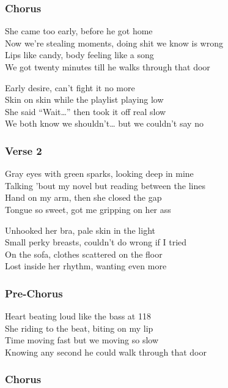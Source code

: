 \subsubsection{Chorus}\label{chorus-85}

She came too early, before he got home\\
Now we're stealing moments, doing shit we know is wrong\\
Lips like candy, body feeling like a song\\
We got twenty minutes till he walks through that door

Early desire, can't fight it no more\\
Skin on skin while the playlist playing low\\
She said ``Wait\ldots'' then took it off real slow\\
We both know we shouldn't\ldots{} but we couldn't say no

\subsubsection{Verse 2}\label{verse-2-33}

Gray eyes with green sparks, looking deep in mine\\
Talking 'bout my novel but reading between the lines\\
Hand on my arm, then she closed the gap\\
Tongue so sweet, got me gripping on her ass

Unhooked her bra, pale skin in the light\\
Small perky breasts, couldn't do wrong if I tried\\
On the sofa, clothes scattered on the floor\\
Lost inside her rhythm, wanting even more

\subsubsection{Pre-Chorus}\label{pre-chorus-68}

Heart beating loud like the bass at 118\\
She riding to the beat, biting on my lip\\
Time moving fast but we moving so slow\\
Knowing any second he could walk through that door

\subsubsection{Chorus}\label{chorus-86}


